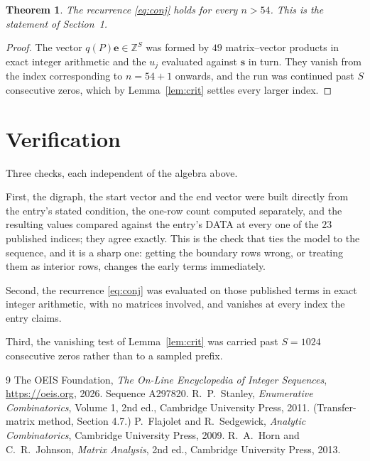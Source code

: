 \documentclass[11pt,a4paper]{article}
\theoremstyle{plain}
\newtheorem{theorem}{Theorem}
\theoremstyle{definition}
\begin{document}
\begin{theorem}
The recurrence \eqref{eq:conj} holds for every $n>54$. This is the statement of
Section~1.
\end{theorem}

\begin{proof}
The vector $q(P)\mathbf{e}\in\mathbb{Z}^{S}$ was formed by $49$ matrix--vector
products in exact integer arithmetic and the $u_j$ evaluated against $\mathbf{s}$ in turn.
They vanish from the index corresponding to $n=54+1$ onwards, and the run was continued
past $S$ consecutive zeros, which by Lemma~\ref{lem:crit} settles every larger index.
\end{proof}

\section{Verification}

Three checks, each independent of the algebra above.

First, the digraph, the start vector and the end vector were built directly from the
entry's stated condition, the one-row count computed separately, and the resulting values
compared against the entry's DATA at every one of the $23$ published indices; they
agree exactly. This is the check that ties the model to the sequence, and it is a sharp one:
getting the boundary rows wrong, or treating them as interior rows, changes the early terms
immediately.

Second, the recurrence \eqref{eq:conj} was evaluated on those published terms in exact
integer arithmetic, with no matrices involved, and vanishes at every index the entry claims.

Third, the vanishing test of Lemma~\ref{lem:crit} was carried past $S=1024$ consecutive
zeros rather than to a sampled prefix.

\begin{thebibliography}{9}
 The OEIS Foundation, \emph{The On-Line Encyclopedia of Integer
Sequences}, \url{https://oeis.org}, 2026. Sequence A297820.
 R.~P.~Stanley, \emph{Enumerative Combinatorics}, Volume 1, 2nd ed.,
Cambridge University Press, 2011. (Transfer-matrix method, Section 4.7.)
 P.~Flajolet and R.~Sedgewick, \emph{Analytic Combinatorics}, Cambridge
University Press, 2009.
 R.~A.~Horn and C.~R.~Johnson, \emph{Matrix Analysis}, 2nd ed., Cambridge
University Press, 2013.
\end{thebibliography}
\end{document}
